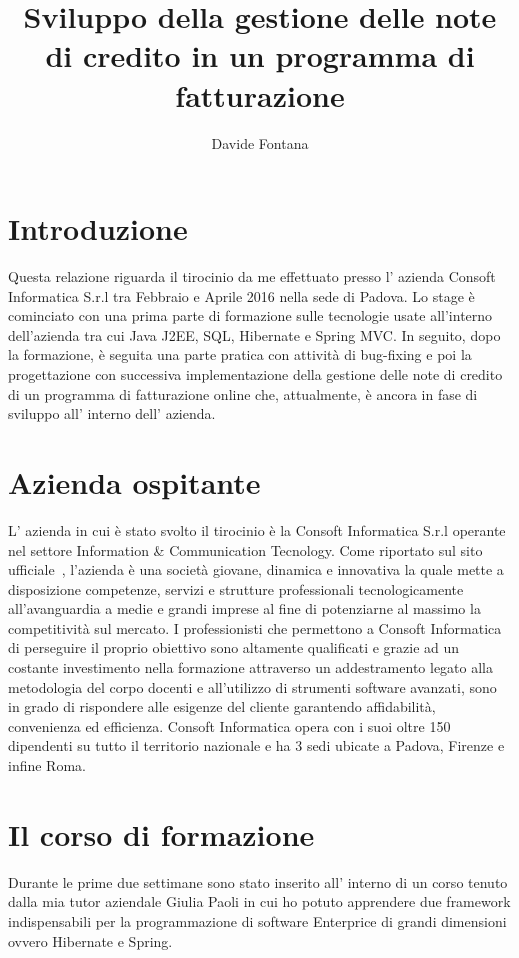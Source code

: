 \documentclass[12pt]{book}
\title{Sviluppo della gestione delle note di credito in un programma di fatturazione}
\author{Davide Fontana}
\date{}
\begin{document}
\maketitle
\tableofcontents
\chapter{Introduzione}
Questa relazione riguarda il tirocinio da me effettuato presso l' azienda 
Consoft Informatica S.r.l tra Febbraio e Aprile 2016 nella sede di Padova.
Lo stage è cominciato con una prima parte di formazione sulle tecnologie usate 
all'interno dell'azienda tra cui Java J2EE, SQL, Hibernate e Spring MVC\@.
In seguito, dopo la formazione, è seguita una parte pratica con attività di 
bug-fixing e poi la progettazione con successiva implementazione della gestione 
delle note di credito di un programma di fatturazione online che, attualmente,
è ancora in fase di sviluppo all' interno dell' azienda. 
\chapter{Azienda ospitante}
L' azienda in cui è stato svolto il tirocinio è la Consoft Informatica S.r.l
operante nel settore Information \& Communication Tecnology\@.
Come riportato sul sito ufficiale~\cite{consoft:descrizione}, l'azienda è una
società giovane, dinamica e innovativa la quale mette a disposizione competenze,
servizi e strutture professionali tecnologicamente all’avanguardia a medie e 
grandi imprese al fine di potenziarne al massimo la competitività sul mercato. 
I professionisti che permettono a Consoft Informatica di perseguire il 
proprio obiettivo sono altamente qualificati e grazie ad un costante 
investimento nella formazione attraverso un  addestramento legato alla 
metodologia del corpo docenti e all’utilizzo di strumenti software avanzati, 
sono in grado di rispondere alle esigenze del cliente garantendo affidabilità,
convenienza ed efficienza.
Consoft Informatica opera con i suoi oltre 150 dipendenti su tutto il territorio
nazionale e ha 3 sedi ubicate a Padova, Firenze e infine Roma. 
\chapter{Il corso di formazione}
Durante le prime due settimane sono stato inserito all’ interno di un corso 
tenuto dalla mia tutor aziendale Giulia Paoli in cui ho potuto apprendere 
due framework indispensabili per la programmazione di software Enterprice
di grandi dimensioni ovvero Hibernate e Spring.
\end{document}
